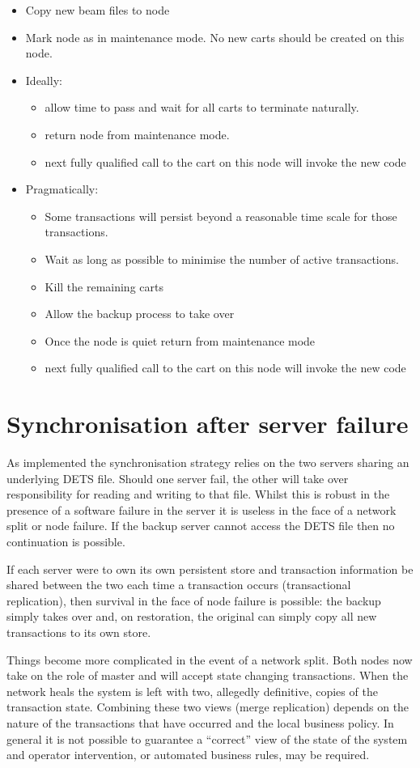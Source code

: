 \documentclass[11pt]{article}
\begin{document}
\begin{itemize}
\item Copy new beam files to node
\item Mark node as in maintenance mode.  No new carts should be created on
  this node.
\item Ideally:
\begin{itemize}
\item allow time to pass and wait for all carts to terminate naturally.
\item return node from maintenance mode.
\item next fully qualified call to the cart on this node will invoke the
    new code
\end{itemize}
\item Pragmatically:
\begin{itemize}
\item Some transactions will persist beyond a reasonable time scale for
    those transactions.
\item Wait as long as possible to minimise the number of active
    transactions.
\item Kill the remaining carts
\item Allow the backup process to take over
\item Once the node is quiet return from maintenance mode
\item next fully qualified call to the cart on this node will invoke the
     new code
\end{itemize}
\end{itemize}
\section{Synchronisation after server failure}
\label{sec-4}


As implemented the synchronisation strategy relies on the two servers
sharing an underlying DETS file.  Should one server fail, the other
will take over responsibility for reading and writing to that file.
Whilst this is robust in the presence of a software failure in the
server it is useless in the face of a network split or node failure.
If the backup server cannot access the DETS file then no continuation
is possible.

If each server were to own its own persistent store and transaction
information be shared between the two each time a transaction occurs
(transactional replication), then survival in the face of node failure
is possible: the backup simply takes over and, on restoration, the
original can simply copy all new transactions to its own store.

Things become more complicated in the event of a network split.  Both
nodes now take on the role of master and will accept state changing
transactions. When the network heals the system is left with two,
allegedly definitive, copies of the transaction state.  Combining
these two views (merge replication) depends on the nature of the
transactions that have occurred and the local business policy.  In
general it is not possible to guarantee a ``correct'' view of the state
of the system and operator intervention, or automated business rules,
may be required.  
\end{document}
